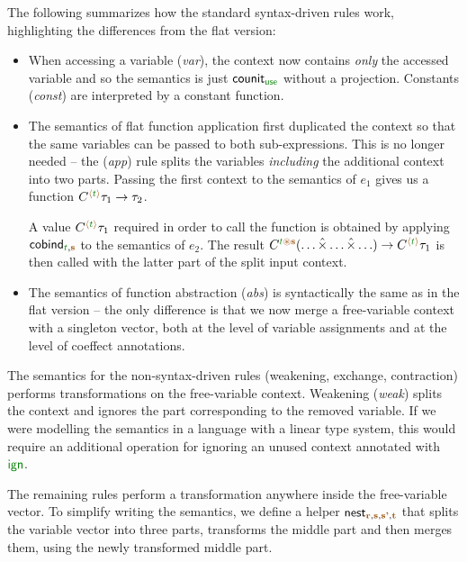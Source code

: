 The following summarizes how the standard syntax-driven rules work, highlighting the differences
from the flat version:

\begin{itemize}
\item When accessing a variable (\emph{var}), the context now contains \emph{only} the accessed
  variable and so the semantics is just $\ident{counit}_{\cunit}$ without a projection.
  Constants (\emph{const}) are interpreted by a constant function.

\item The semantics of flat function application first duplicated the context so that the same
  variables can be passed to both sub-expressions. This is no longer needed -- the
  (\emph{app}) rule splits the variables \emph{including} the additional context into two parts.
  Passing the first context to the semantics of $e_1$ gives us a function
  $\ctyp{\alift{\cclrd{t}}}{\tau_1} \rightarrow \tau_2$.

  A value $\ctyp{\alift{\cclrd{t}}}{\tau_1}$ required in order to call the function is obtained by
  applying $\ident{cobind}_{\cclrd{t}, \aclrd{\textbf{s}}}$ to the semantics of $e_2$. The result
  $\ctyp{\cclrd{t}\aseq\aclrd{\textbf{s}}}{(\ldots \xtimes \ldots \xtimes \ldots)} \rightarrow \ctyp{\alift{\cclrd{t}}}{\tau_1}$
  is then called with the latter part of the split input context.

\item The semantics of function abstraction (\emph{abs}) is syntactically the same as in the
  flat version -- the only difference is that we now merge a free-variable context with a
  singleton vector, both at the level of variable assignments and at the level of coeffect
  annotations.
\end{itemize}

\noindent
The semantics for the non-syntax-driven rules (weakening, exchange, contraction) performs
transformations on the free-variable context. Weakening (\emph{weak}) splits the context and
ignores the part corresponding to the removed variable. If we were modelling the semantics in
a language with a linear type system, this would require an additional operation for ignoring an
unused context annotated with $\aclrd{\czero}$.

The remaining rules perform a transformation anywhere inside the free-variable vector.
To simplify writing the semantics, we define a helper
$\ident{nest}_{\aclrd{\textbf{r}}, \aclrd{\textbf{s}}, \aclrd{\textbf{s'}}, \aclrd{\textbf{t}}}$
that splits the variable vector into three parts, transforms the middle part and then
merges them, using the newly transformed middle part.

